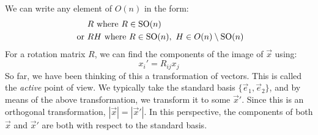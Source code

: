 \documentclass[../main.tex]{subfiles}
\begin{document}
We can write any element of $O(n)$ in the form:
\begin{align*}
  &R \text{ where }R \in \mathrm{SO}(n) \\
  \text{ or }&RH \text{ where } R \in \mathrm{SO}(n),\ H \in O(n) \setminus \mathrm{SO}(n)
\end{align*}
For a rotation matrix $R$, we can find the components of the image of $\vec{x}$ using:
\[
  x_i' = R_{i j}x_j
\]
So far, we have been thinking of this a transformation of vectors.
This is called the \textit{active} point of view.
We typically take the standard basis $\{\vec{e}_1, \vec{e}_2\}$, and by means of the above transformation, we transform it to some $\vec{x}'$.
Since this is an orthogonal transformation, $|\vec{x}| = |\vec{x}'|$.
In this perspective, the components of both $\vec{x}$ and $\vec{x}'$ are both with respect to the standard basis.
\begin{center}
\end{center}
\end{document}

